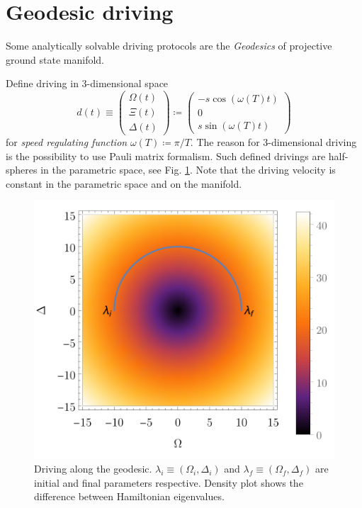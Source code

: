 \section{Geodesic driving}
Some analytically solvable driving protocols are the \emph{Geodesics} of projective ground state manifold. 

Define driving in 3-dimensional space
\begin{equation}
    d(t)\equiv \begin{pmatrix}
        \Omega(t)\\
        \Xi(t)\\
        \Delta(t)
    \end{pmatrix}\coloneqq \begin{pmatrix}
        -s \cos(\omega(T)t)\\
        0\\
        s \sin(\omega(T)t)
    \end{pmatrix}
\end{equation}
for \emph{speed regulating function} $\omega(T)\coloneqq \pi/T$. The reason for 3-dimensional driving is the possibility to use Pauli matrix formalism. Such defined drivings are half-spheres in the parametric space, see Fig. \ref{fig:driving}. Note that the driving velocity is constant in the parametric space and on the manifold.

\begin{figure}[h]
    \centering
    \includegraphics[scale=1.2]{../img/driving.pdf}
    \caption{Driving along the geodesic. $\lambda_i\equiv (\Omega_i,\Delta_i)$ and $\lambda_f\equiv (\Omega_f,\Delta_f)$ are initial and final parameters respective. Density plot shows the difference between Hamiltonian eigenvalues.}
    \label{fig:driving}
\end{figure}

